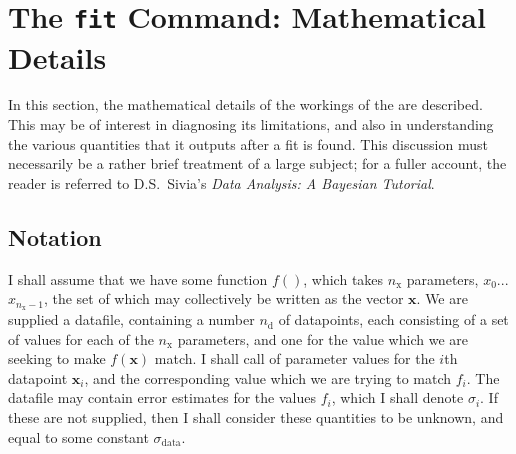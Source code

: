 %
%
%
%
%



\chapter{The {\tt fit} Command: Mathematical Details}
\label{ch:fit_maths}

In this section, the mathematical details of the workings of the 
are described. This may be of interest in diagnosing its limitations, and also
in understanding the various quantities that it outputs after a fit is found.
This discussion must necessarily be a rather brief treatment of a large
subject; for a fuller account, the reader is referred to D.S.\ Sivia's {\it
Data Analysis: A Bayesian Tutorial}.

\section{Notation}
\label{sec:bayes_notation}

I shall assume that we have some function $f()$, which takes $n_\mathrm{x}$
parameters, $x_0$...$x_{n_\mathrm{x}-1}$, the set of which may collectively be
written as the vector $\mathbf{x}$. We are supplied a datafile, containing a
number $n_\mathrm{d}$ of datapoints, each consisting of a set of values for
each of the $n_\mathrm{x}$ parameters, and one for the value which we are
seeking to make $f(\mathbf{x})$ match. I shall call of parameter values for the
$i$th datapoint $\mathbf{x}_i$, and the corresponding value which we are trying
to match $f_i$. The datafile may contain error estimates for the values $f_i$,
which I shall denote $\sigma_i$. If these are not supplied, then I shall
consider these quantities to be unknown, and equal to some constant
$\sigma_\mathrm{data}$.

